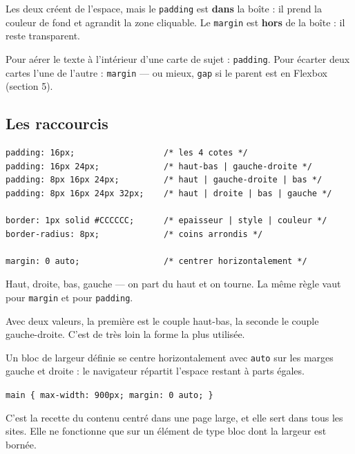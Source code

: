 \documentclass[a4paper,11pt]{article}
\begin{document}
\begin{tcolorbox}[attention, title={\texttt{padding} ou \texttt{margin} ? La question du fond}]
Les deux créent de l'espace, mais le \texttt{padding} est \textbf{dans} la boîte : il prend la couleur de fond et agrandit la zone cliquable. Le \texttt{margin} est \textbf{hors} de la boîte : il reste transparent.

\vspace{3pt}
Pour aérer le texte à l'intérieur d'une carte de sujet : \texttt{padding}. Pour écarter deux cartes l'une de l'autre : \texttt{margin} --- ou mieux, \texttt{gap} si le parent est en Flexbox (section 5).
\end{tcolorbox}

\subsection{Les raccourcis}

\begin{lstlisting}[language=CSS3, caption={De une à quatre valeurs}]
padding: 16px;                  /* les 4 cotes */
padding: 16px 24px;             /* haut-bas | gauche-droite */
padding: 8px 16px 24px;         /* haut | gauche-droite | bas */
padding: 8px 16px 24px 32px;    /* haut | droite | bas | gauche */

border: 1px solid #CCCCCC;      /* epaisseur | style | couleur */
border-radius: 8px;             /* coins arrondis */

margin: 0 auto;                 /* centrer horizontalement */
\end{lstlisting}

\begin{tcolorbox}[astuce, title={Quatre valeurs : dans le sens des aiguilles d'une montre}]
Haut, droite, bas, gauche --- on part du haut et on tourne. La même règle vaut pour \texttt{margin} et pour \texttt{padding}.

\vspace{3pt}
Avec deux valeurs, la première est le couple haut-bas, la seconde le couple gauche-droite. C'est de très loin la forme la plus utilisée.
\end{tcolorbox}

\begin{tcolorbox}[astuce, title={\texttt{margin: 0 auto} pour centrer un bloc}]
Un bloc de largeur définie se centre horizontalement avec \texttt{auto} sur les marges gauche et droite : le navigateur répartit l'espace restant à parts égales.

\vspace{3pt}
\texttt{\small main \{ max-width: 900px; margin: 0 auto; \}}

\vspace{3pt}
C'est la recette du contenu centré dans une page large, et elle sert dans tous les sites. Elle ne fonctionne que sur un élément de type bloc dont la largeur est bornée.
\end{tcolorbox}
\end{document}
